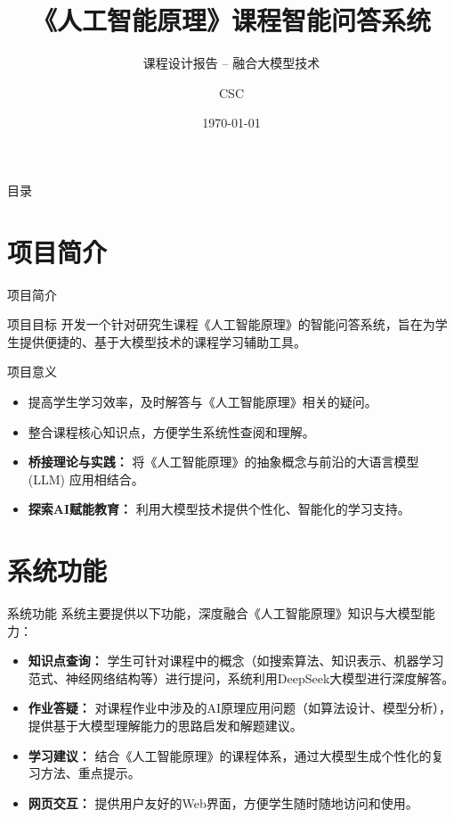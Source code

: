 \documentclass{beamer}
\title{《人工智能原理》课程智能问答系统}
\subtitle{课程设计报告 -- 融合大模型技术}
\author{CSC}
\institute{计算机学院}
\date{\today}
\begin{document}
\begin{frame}
  \titlepage
\end{frame}

\begin{frame}{目录}
  \tableofcontents
\end{frame}

\section{项目简介}
\begin{frame}{项目简介}
  \begin{block}{项目目标}
    开发一个针对研究生课程《人工智能原理》的智能问答系统，旨在为学生提供便捷的、基于大模型技术的课程学习辅助工具。
  \end{block}
  \begin{block}{项目意义}
    \begin{itemize}
        \item 提高学生学习效率，及时解答与《人工智能原理》相关的疑问。
        \item 整合课程核心知识点，方便学生系统性查阅和理解。
        \item \textbf{桥接理论与实践：} 将《人工智能原理》的抽象概念与前沿的大语言模型 (LLM) 应用相结合。
        \item \textbf{探索AI赋能教育：} 利用大模型技术提供个性化、智能化的学习支持。
    \end{itemize}
  \end{block}
\end{frame}

\section{系统功能}
\begin{frame}{系统功能}
  系统主要提供以下功能，深度融合《人工智能原理》知识与大模型能力：
  \begin{itemize}
    \item \textbf{知识点查询：} 学生可针对课程中的概念（如搜索算法、知识表示、机器学习范式、神经网络结构等）进行提问，系统利用DeepSeek大模型进行深度解答。
    \item \textbf{作业答疑：} 对课程作业中涉及的AI原理应用问题（如算法设计、模型分析），提供基于大模型理解能力的思路启发和解题建议。
    \item \textbf{学习建议：} 结合《人工智能原理》的课程体系，通过大模型生成个性化的复习方法、重点提示。
    \item \textbf{网页交互：} 提供用户友好的Web界面，方便学生随时随地访问和使用。
  \end{itemize}
\end{frame}
\end{document}
